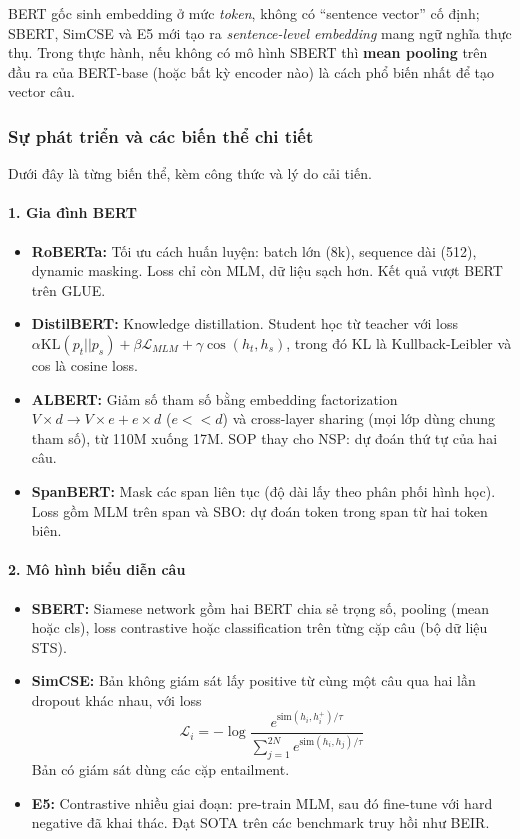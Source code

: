 BERT gốc sinh embedding ở mức \textit{token}, không có “sentence vector” cố định; SBERT, SimCSE và E5 mới tạo ra \textit{sentence-level embedding} mang ngữ nghĩa thực thụ. Trong thực hành, nếu không có mô hình SBERT thì \textbf{mean pooling} trên đầu ra của BERT-base (hoặc bất kỳ encoder nào) là cách phổ biến nhất để tạo vector câu.

\subsubsection{Sự phát triển và các biến thể chi tiết}
Dưới đây là từng biến thể, kèm công thức và lý do cải tiến.

\paragraph{1. Gia đình BERT}
\begin{itemize}
	\item \textbf{RoBERTa:} Tối ưu cách huấn luyện: batch lớn (8k), sequence dài (512), dynamic masking. Loss chỉ còn MLM, dữ liệu sạch hơn. Kết quả vượt BERT trên GLUE.
	\item \textbf{DistilBERT:} Knowledge distillation. Student học từ teacher với loss $\alpha \text{KL}(p_t || p_s) + \beta \mathcal{L}_{MLM} + \gamma \cos(h_t, h_s)$, trong đó KL là Kullback-Leibler và cos là cosine loss.
	\item \textbf{ALBERT:} Giảm số tham số bằng embedding factorization $V \times d \to V \times e + e \times d$ ($e<<d$) và cross-layer sharing (mọi lớp dùng chung tham số), từ 110M xuống 17M. SOP thay cho NSP: dự đoán thứ tự của hai câu.
	\item \textbf{SpanBERT:} Mask các span liên tục (độ dài lấy theo phân phối hình học). Loss gồm MLM trên span và SBO: dự đoán token trong span từ hai token biên.
\end{itemize}

\paragraph{2. Mô hình biểu diễn câu}
\begin{itemize}
	\item \textbf{SBERT:} Siamese network gồm hai BERT chia sẻ trọng số, pooling (mean hoặc cls), loss contrastive hoặc classification trên từng cặp câu (bộ dữ liệu STS).
	\item \textbf{SimCSE:} Bản không giám sát lấy positive từ cùng một câu qua hai lần dropout khác nhau, với loss
	\[
	\mathcal{L}_i = -\log \frac{e^{\text{sim}(h_i, h_i^+)/\tau}}{\sum_{j=1}^{2N} e^{\text{sim}(h_i, h_j)/\tau}}
	\]
	Bản có giám sát dùng các cặp entailment.
	\item \textbf{E5:} Contrastive nhiều giai đoạn: pre-train MLM, sau đó fine-tune với hard negative đã khai thác. Đạt SOTA trên các benchmark truy hồi như BEIR.
\end{itemize}


